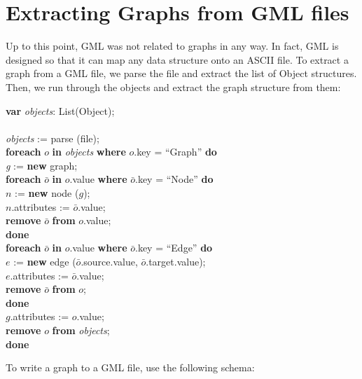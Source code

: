 %
%

\chapter{Extracting Graphs from GML files}

Up to this point, GML was not related to graphs in any way.  In
fact, GML is designed so that it can map any data structure onto
an ASCII file.  To extract a graph from a GML file, we parse the
file and extract the list of Object structures.  Then, we run
through the objects and extract the graph structure from them:

\begin{program}
\textbf{var} \emph{objects}: List(Object); \\
\\
\emph{objects} := parse (file); \\
\textbf{foreach} $o$ \textbf{in} \emph{objects} \textbf{where} $o$.key = ``Graph'' \textbf{do} \\
\> \emph{g} := \textbf{new} graph; \\
\> \textbf{foreach} $\bar{o}$ \textbf{in} $o$.value \textbf{where} $\bar{o}$.key = ``Node'' \textbf{do} \\
\> \> $n$ := \textbf{new} node ($g$); \\
\> \> $n$.attributes := $\bar{o}$.value; \\
\> \> \textbf{remove} $\bar{o}$ \textbf{from} $o$.value; \\
\> \textbf{done} \\
\> \textbf{foreach} $\bar{o}$ \textbf{in} $o$.value \textbf{where} $\bar{o}$.key = ``Edge'' \textbf{do} \\
\> \> $e$ := \textbf{new} edge ($\bar{o}$.source.value, $\bar{o}$.target.value); \\
\> \> $e$.attributes := $\bar{o}$.value; \\
\> \> \textbf{remove} $\bar{o}$ \textbf{from} $o$; \\
\> \textbf{done} \\
\> $g$.attributes := $o$.value; \\
\> \textbf{remove} $o$ \textbf{from} \emph{objects}; \\
\textbf{done} \\
\end{program}

\noindent To write a graph to a GML file, use the following schema:

